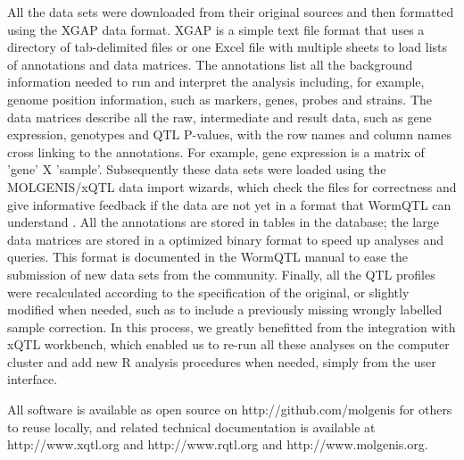 All the data sets were downloaded from their original sources and then formatted using the 
XGAP data format. XGAP is a simple text file format that uses a directory of tab-delimited 
files or one Excel file with multiple sheets to load lists of annotations and data matrices. 
The annotations list all the background information needed to run and interpret the analysis 
including, for example, genome position information, such as markers, genes, probes and 
strains. The data matrices describe all the raw, intermediate and result data, such as gene 
expression, genotypes and QTL P-values, with the row names and column names cross linking to 
the annotations. For example, gene expression is a matrix of 'gene' X 'sample'. Subsequently 
these data sets were loaded using the MOLGENIS/xQTL data import wizards, which check the 
files for correctness and give informative feedback if the data are not yet in a format that 
WormQTL can understand \cite{Swertz:2010a}. All the annotations are stored in tables in the database; the 
large data matrices are stored in a optimized binary format to speed up analyses and queries. 
This format is documented in the WormQTL manual to ease the submission of new data sets from 
the community. Finally, all the QTL profiles were recalculated according to the specification 
of the original, or slightly modified when needed, such as to include a previously missing 
wrongly labelled sample correction. In this process, we greatly benefitted from the integration 
with xQTL workbench, which enabled us to re-run all these analyses on the computer cluster 
and add new R analysis procedures when needed, simply from the user interface.

All software is available as open source on http://github.com/molgenis for others to reuse 
locally, and related technical documentation is available at http://www.xqtl.org and 
http://www.rqtl.org and http://www.molgenis.org.

